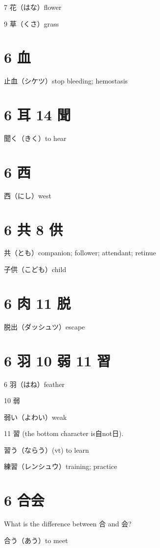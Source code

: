7 花（はな）flower

9 草（くさ）grass

\section{6 血}

止血（シケツ）stop bleeding; hemostasis

\section{6 耳 14 聞}

聞く（きく）to hear

\section{6 西}

西（にし）west

\section{6 共 8 供}

共（とも）companion; follower; attendant; retinue

子供（こども）child

\section{6 肉 11 脱}

脱出（ダッシュツ）escape

\section{6 羽 10 弱 11 習}

6 羽（はね）feather

10 弱

弱い（よわい）weak

11 習 (the bottom character is自not日).

習う（ならう）(vt) to learn

練習（レンシュウ）training; practice

\section{6 合会}

What is the difference between 合 and 会?

合う（あう）to meet

